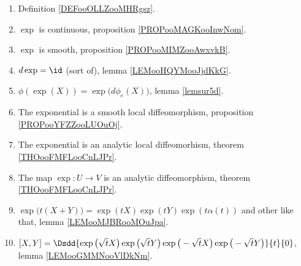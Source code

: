 
\begin{enumerate}
	\item
	      Definition \ref{DEFooOLLZooMHRgsz}.
      \item
          \( \exp\) is continuous, proposition \ref{PROPooMAGKooInwNom}.
      \item
          \( \exp\) is smooth, proposition \ref{PROPooMIMZooAwxvkB}.
      \item
          \( d\exp=\id\) (sort of), lemma \ref{LEMooHQYMooJjdKkG}.
      \item
          \( \phi(\exp(X))=\exp\big( d\phi_e(X) \big)\), lemma \ref{lemsur5d}.
	\item
	      The exponential is a smooth local diffeomorphism, proposition \ref{PROPooYFZZooLUOuOj}.
	\item
	      The exponential is an analytic local diffeomorhism, theorem \ref{THOooFMFLooCnLJPr}.
	\item
	      The map \( \exp\colon U\to V\) is an analytic diffeomorphism, theorem \ref{THOooFMFLooCnLJPr}.
      \item
          \( \exp\big( t(X+Y) \big)=\exp(tX)\exp(tY)\exp(t\alpha(t))\) and other like that, lemma \ref{LEMooMJBRooMOuJpa}.
      \item
          $[X,Y]=\Dsdd{ \exp\big( \sqrt{ t }X \big)\exp\big( \sqrt{ t }Y \big)\exp\big( -\sqrt{ t }X \big)\exp\big( -\sqrt{ t }Y \big) }{t}{0}$, lemma \ref{LEMooGMMNooVlDkNm}.
\end{enumerate}
